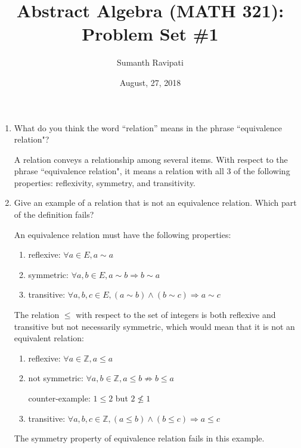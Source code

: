 \documentclass{article}
\begin{document}
%
\title{Abstract Algebra (MATH 321): Problem Set \#1}
\author{Sumanth Ravipati}
\date{August, 27, 2018}
\maketitle

\begin{enumerate}
\item What do you think the word ``relation'' means in the phrase ``equivalence relation"?

\begin{flushleft}
A relation conveys a relationship among several items. With respect to the phrase ``equivalence relation", it means a relation with all 3 of the following properties: reflexivity, symmetry, and transitivity.
\end{flushleft}

\item Give an example of a relation that is not an equivalence relation. Which part of the definition fails?

\begin{flushleft}
An equivalence relation must have the following properties:
\begin{enumerate}
    \item reflexive: $ \forall a \in E, a \sim a $
    \item symmetric: $ \forall a,b \in E, a \sim b \Rightarrow b \sim a $
    \item transitive: $ \forall a,b,c \in E, (a \sim b) \wedge (b \sim c) \Rightarrow a \sim c $
\end{enumerate}
The relation $\leq$ with respect to the set of integers is both reflexive and transitive but not necessarily symmetric, which would mean that it is not an equivalent relation:
\begin{enumerate}
    \item reflexive: $ \forall a \in \mathbb{Z}, a \leq a $
    \item not symmetric: $ \forall a,b \in \mathbb{Z}, a \leq b \not\Rightarrow b \leq a $
    \begin{flushleft}
        counter-example: $ 1 \leq 2 $ but $ 2 \not\leq 1 $
    \end{flushleft}
    \item transitive: $ \forall a,b,c \in \mathbb{Z}, (a \leq b) \wedge (b \leq c) \Rightarrow a \leq c $
\end{enumerate}
The symmetry property of equivalence relation fails in this example.
\end{flushleft}


\end{enumerate}
\end{document}

